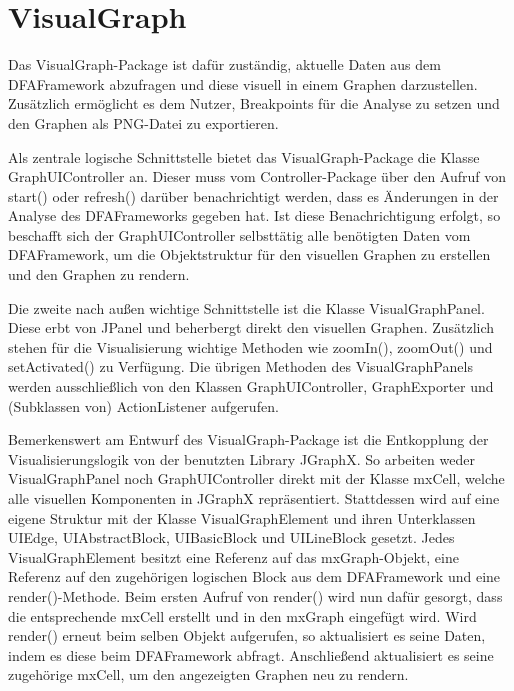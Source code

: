 
\section{VisualGraph}

Das VisualGraph-Package ist dafür zuständig, aktuelle Daten aus dem DFAFramework abzufragen und diese visuell in einem Graphen darzustellen. 
Zusätzlich ermöglicht es dem Nutzer, Breakpoints für die Analyse zu setzen und den Graphen als PNG-Datei zu exportieren.

Als zentrale logische Schnittstelle bietet das VisualGraph-Package die Klasse GraphUIController an. 
Dieser muss vom Controller-Package über den Aufruf von start() oder refresh() darüber benachrichtigt werden, dass es Änderungen in der Analyse des DFAFrameworks gegeben hat.
Ist diese Benachrichtigung erfolgt, so beschafft sich der GraphUIController selbsttätig alle benötigten Daten vom DFAFramework, um die Objektstruktur für den visuellen Graphen zu erstellen und den Graphen zu rendern.

Die zweite nach außen wichtige Schnittstelle ist die Klasse VisualGraphPanel. Diese erbt von JPanel und beherbergt direkt den visuellen Graphen.
Zusätzlich stehen für die Visualisierung wichtige Methoden wie zoomIn(), zoomOut() und setActivated() zu Verfügung.
Die übrigen Methoden des VisualGraphPanels werden ausschließlich von den Klassen GraphUIController, GraphExporter und (Subklassen von) ActionListener aufgerufen.

Bemerkenswert am Entwurf des VisualGraph-Package ist die Entkopplung der Visualisierungslogik von der benutzten Library JGraphX.
So arbeiten weder VisualGraphPanel noch GraphUIController direkt mit der Klasse mxCell, welche alle visuellen Komponenten in JGraphX repräsentiert.
Stattdessen wird auf eine eigene Struktur mit der Klasse VisualGraphElement und ihren Unterklassen UIEdge, UIAbstractBlock, UIBasicBlock und UILineBlock gesetzt.
Jedes VisualGraphElement besitzt eine Referenz auf das mxGraph-Objekt, eine Referenz auf den zugehörigen logischen Block aus dem DFAFramework und eine render()-Methode.
Beim ersten Aufruf von render() wird nun dafür gesorgt, dass die entsprechende mxCell erstellt und in den mxGraph eingefügt wird.
Wird render() erneut beim selben Objekt aufgerufen, so aktualisiert es seine Daten, indem es diese beim DFAFramework abfragt.
Anschließend aktualisiert es seine zugehörige mxCell, um den angezeigten Graphen neu zu rendern.

